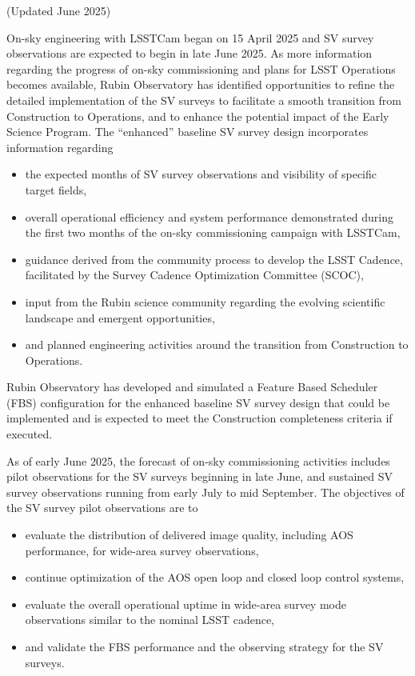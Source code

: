 (Updated June 2025)

On-sky engineering with LSSTCam began on 15 April 2025 and SV survey observations are expected to begin in late June 2025.
As more information regarding the progress of on-sky commissioning and plans for LSST Operations becomes available, Rubin Observatory has identified opportunities to refine the detailed implementation of the SV surveys to facilitate a smooth transition from Construction to Operations, and to enhance the potential impact of the Early Science Program.
The ``enhanced'' baseline SV survey design incorporates information regarding
\begin{itemize}
        \item the expected months of SV survey observations and visibility of specific target fields,
        \item overall operational efficiency and system performance demonstrated during the first two months of the on-sky commissioning campaign with LSSTCam,
        \item guidance derived from the community process to develop the LSST Cadence, facilitated by the Survey Cadence Optimization Committee (SCOC),
        \item input from the Rubin science community regarding the evolving scientific landscape and emergent opportunities,
        \item and planned engineering activities around the transition from Construction to Operations.
\end{itemize}

Rubin Observatory has developed and simulated a Feature Based Scheduler (FBS) configuration for the enhanced baseline SV survey design that could be implemented and is expected to meet the Construction completeness criteria if executed.

As of early June 2025, the forecast of on-sky commissioning activities includes pilot observations for the SV surveys beginning in late June, and sustained SV survey observations running from early July to mid September. The objectives of the SV survey pilot observations are to
\begin{itemize}
        \item evaluate the distribution of delivered image quality, including AOS performance, for wide-area survey observations,
        \item continue optimization of the AOS open loop and closed loop control systems,
        \item evaluate the overall operational uptime in wide-area survey mode observations similar to the nominal LSST cadence,
        \item and validate the FBS performance and the observing strategy for the SV surveys.
\end{itemize}

